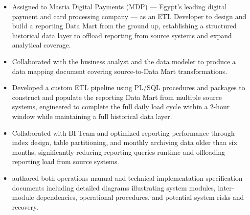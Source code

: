 
\begin{itemize}
    \item Assigned to Masria Digital Payments (MDP) — Egypt's leading digital payment and card processing company — as an ETL Developer to design and build a reporting Data Mart from the ground up, establishing a structured historical data layer to offload reporting from source systems and expand analytical coverage.
    \item Collaborated with the business analyst and the data modeler to produce a data mapping document covering source-to-Data Mart transformations.
    \item Developed a custom ETL pipeline using PL/SQL procedures and packages to construct and populate the reporting Data Mart from multiple source systems, engineered to complete the full daily load cycle within a 2-hour window while maintaining a full historical data layer.
    \item Collaborated with BI Team and optimized reporting performance through index design, table partitioning, and monthly archiving data older than six months, significantly reducing reporting queries runtime and offloading reporting load from source systems.
    \item authored both operations manual and technical implementation specification documents including detailed diagrams illustrating system modules, inter-module dependencies, operational procedures, and potential system risks and recovery.

\end{itemize}
